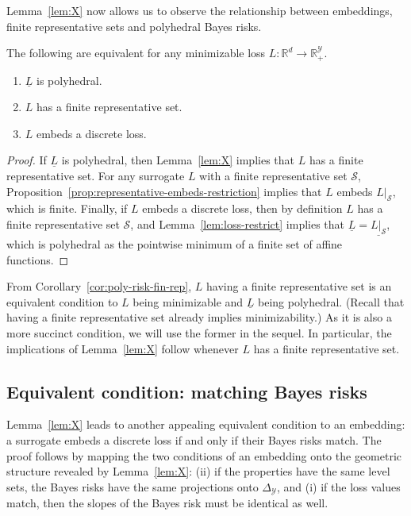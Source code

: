 \documentclass[twoside,11pt]{article}
\newcommand{\reals}{\mathbb{R}}
\newcommand{\simplex}{\Delta_\Y}
\newcommand{\Sc}{\mathcal{S}}
\newcommand{\Y}{\mathcal{Y}}
\newcommand{\risk}[1]{\underline{#1}}
\begin{document}
Lemma~\ref{lem:X} now allows us to observe the relationship between embeddings, finite representative sets and polyhedral Bayes risks.
\begin{corollary}\label{cor:poly-risk-fin-rep}
  The following are equivalent for any minimizable loss $L:\reals^d\to\reals^\Y_+$.
  \begin{enumerate}
  \item $\risk{L}$ is polyhedral.
  \item $L$ has a finite representative set.
  \item $L$ embeds a discrete loss.
  \end{enumerate}
\end{corollary}
\begin{proof}
	If $\risk L$ is polyhedral, then Lemma~\ref{lem:X} implies that $L$ has a finite representative set.
  For any surrogate $L$ with a finite representative set $\Sc$, Proposition~\ref{prop:representative-embeds-restriction} implies that $L$ embeds $L|_{\Sc}$, which is finite.
  Finally, if $L$ embeds a discrete loss, then by definition $L$ has a finite representative set $\Sc$, and Lemma~\ref{lem:loss-restrict} implies that $\risk L = \risk{L|_\Sc}$, which is polyhedral as the pointwise minimum of a finite set of affine functions.
\end{proof}

From Corollary~\ref{cor:poly-risk-fin-rep}, $L$ having a finite representative set is an equivalent condition to $L$ being minimizable and $\risk{L}$ being polyhedral.
(Recall that having a finite representative set already implies minimizability.)
As it is also a more succinct condition, we will use the former in the sequel.
In particular, the implications of Lemma~\ref{lem:X} follow whenever $L$ has a finite representative set.


\subsection{Equivalent condition: matching Bayes risks}\label{subsec:match-BR}


Lemma~\ref{lem:X} leads to another appealing equivalent condition to an embedding: a surrogate embeds a discrete loss if and only if their Bayes risks match.
The proof follows by mapping the two conditions of an embedding onto the geometric structure revealed by Lemma~\ref{lem:X}: (ii) if the properties have the same level sets, the Bayes risks have the same projections onto $\simplex$, and (i) if the loss values match, then the slopes of the Bayes risk must be identical as well.
\end{document}
